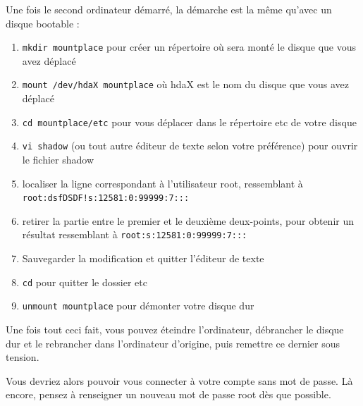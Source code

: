 Une fois le second ordinateur démarré, la démarche est la même qu'avec un disque bootable :
\begin{enumerate}
	\item \verb|mkdir mountplace| pour créer un répertoire où sera monté le disque que vous avez déplacé
    \item \verb|mount /dev/hdaX mountplace| où hdaX est le nom du disque que vous avez déplacé
    \item \verb|cd mountplace/etc| pour vous déplacer dans le répertoire etc de votre disque
    \item \verb|vi shadow| (ou tout autre éditeur de texte selon votre préférence) pour ouvrir le fichier shadow
    \item localiser la ligne correspondant à l'utilisateur root, ressemblant à \verb|root:dsfDSDF!s:12581:0:99999:7:::|
    \item retirer la partie entre le premier et le deuxième deux-points, pour obtenir un résultat ressemblant à \verb|root:s:12581:0:99999:7:::|
    \item Sauvegarder la modification et quitter l'éditeur de texte
    \item \verb|cd| pour quitter le dossier etc
    \item \verb|unmount mountplace| pour démonter votre disque dur
\end{enumerate}

Une fois tout ceci fait, vous pouvez éteindre l'ordinateur, débrancher le disque dur et le rebrancher dans l'ordinateur d'origine, puis remettre ce dernier sous tension. 

Vous devriez alors pouvoir vous connecter à votre compte sans mot de passe. Là encore, pensez à renseigner un nouveau mot de passe root dès que possible. 